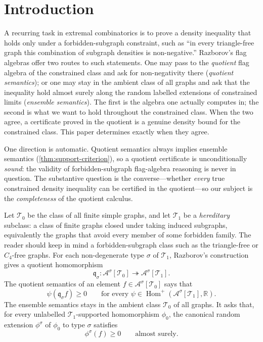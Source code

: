 \documentclass[11pt]{article}
\theoremstyle{definition}
\newcommand{\R}{\mathbb{R}}
\newcommand{\A}{\mathcal{A}}
\newcommand{\T}{\mathcal{T}}
\newcommand{\Homp}{\operatorname{Hom}^{+}}
\newcommand{\qmap}{\mathfrak q}
\begin{document}
\section{Introduction}

A recurring task in extremal combinatorics is to prove a density inequality that
holds only under a forbidden-subgraph constraint, such as ``in every triangle-free
graph this combination of subgraph densities is non-negative.''  Razborov's flag
algebras offer two routes to such statements.  One may pass to the \emph{quotient}
flag algebra of the constrained class and ask for non-negativity there
(\emph{quotient semantics}); or one may stay in the ambient class of all graphs and
ask that the inequality hold almost surely along the random labelled extensions of
constrained limits (\emph{ensemble semantics}).  The first is the algebra one
actually computes in; the second is what we want to hold throughout the
constrained class.  When the two agree, a certificate proved in the quotient is a
genuine density bound for the constrained class.  This paper determines exactly when
they agree.

One direction is automatic.  Quotient semantics always implies ensemble semantics
(\cref{thm:support-criterion}), so a quotient certificate is unconditionally
\emph{sound}: the validity of forbidden-subgraph flag-algebra reasoning is never in
question.  The substantive question is the converse---whether \emph{every} true
constrained density inequality can be certified in the quotient---so our subject is the
\emph{completeness} of the quotient calculus.

Let $\T_0$ be the class of all finite simple graphs, and let $\T_1$ be a
\emph{hereditary} subclass: a class of finite graphs closed under taking induced
subgraphs, equivalently the graphs that avoid every member of some forbidden family.
The reader should keep in mind a forbidden-subgraph class such as the triangle-free or
$C_4$-free graphs.  For
each non-degenerate type $\sigma$ of $\T_1$, Razborov's construction gives a
quotient homomorphism
\[
  \qmap_\sigma:\A^\sigma[\T_0]\twoheadrightarrow \A^\sigma[\T_1].
\]
The quotient semantics of an element $f\in\A^\sigma[\T_0]$ says that
\[
  \psi(\qmap_\sigma f)\ge 0
  \qquad\text{for every }\psi\in\Homp(\A^\sigma[\T_1],\R).
\]
The ensemble semantics stays in the ambient class $\T_0$ of all graphs.  It asks that, for
every unlabelled $\T_1$-supported homomorphism $\phi_0$, the canonical random
extension $\phi^\sigma$ of $\phi_0$ to type $\sigma$ satisfies
\[
  \phi^\sigma(f)\ge 0
  \qquad\text{almost surely.}
\]
\end{document}
